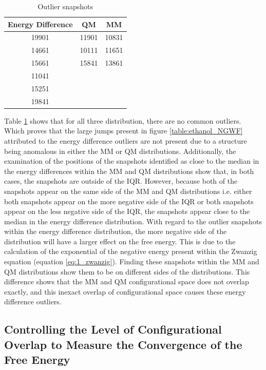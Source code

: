 \begin{table}[ht]
 \caption{Outlier snapshots}
  \begin{center}
  \begin{tabular}{c|c|c}
   \hline\hline
 Energy Difference & QM & MM \\ [0.5ex]
\hline
19901 & 11901 & 10831 \\
14661 & 10111 & 11651 \\
15661 & 15841 & 13861 \\
11041 & & \\
15251 & & \\
19841 & & \\
  \end{tabular}\label{table:outlier_snapshots}
 \end{center}
\end{table}

Table \ref{table:outlier_snapshots} shows that for all three distribution, there are no common outliers.  Which proves that the large jumps present in figure \ref{table:ethanol_NGWF} attributed to the energy difference outliers are not present due to a structure being anomalous in either the MM or QM distributions.  Additionally, the examination of the positions of the snapshots identified as close to the median in the energy differences within the MM and QM distributions show that, in both cases, the snapshots are outside of the IQR.  However, because both of the snapshots appear on the same side of the MM and QM distributions i.e. either both snapshots appear on the more negative side of the IQR or both snapshots appear on the less negative side of the IQR, the snapshots appear close to the median in the energy difference distribution.  With regard to the outlier snapshots within the energy difference distribution, the more negative side of the distribution will have a larger effect on the free energy.  This is due to the calculation of the exponential of the negative energy present within the Zwanzig equation (equation \ref{eq:1_zwanzig}).  Finding these snapshots within the MM and QM distributions show them to be on different sides of the distributions.  This difference shows that the MM and QM configurational space does not overlap exactly, and this inexact overlap of configurational space causes these energy difference outliers.  

\subsection{Controlling the Level of Configurational Overlap to Measure the Convergence of the Free Energy}

